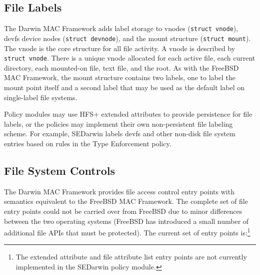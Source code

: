 \subsection{File Labels}

The Darwin MAC Framework adds label storage to vnodes ({\tt struct
vnode}), devfs device nodes ({\tt struct devnode}), and the mount
structure ({\tt struct mount}).  The vnode is the core structure
for all file activity.  A vnode is described by {\tt struct vnode}.
There is a unique vnode allocated for each active file, each current
directory, each mounted-on file, text file, and the root.  As with
the FreeBSD MAC Framework, the mount structure contains two labels,
one to label the mount point itself and a second label that may be
used as the default label on single-label file systems.

Policy modules may use HFS+ extended attributes to provide persistence
for file labels, or the policies may implement their own non-persistent
file labeling scheme.  For example, SEDarwin labels devfs and other
non-disk file system entries based on rules in the Type Enforcement
policy.

\subsection{File System Controls}

The Darwin MAC Framework provides file access control entry points
with semantics equivalent to the FreeBSD MAC Framework.  The complete
set of file entry points could not be carried over from FreeBSD due
to minor differences between the two operating systems (FreeBSD has
introduced a small number of additional file APIs that must be
protected).  The current set of entry points is:\footnote{The
extended attribute and file attribute list entry points are not
currently implemented in the SEDarwin policy module.}

